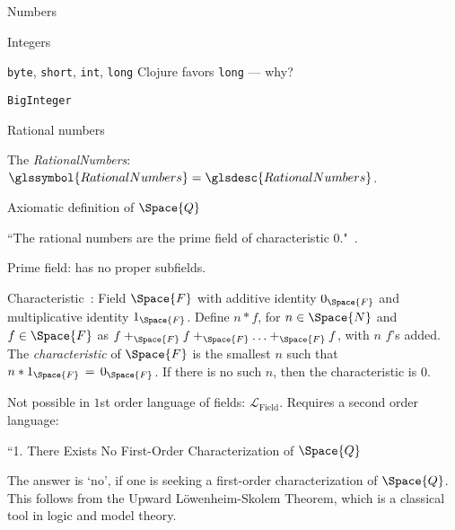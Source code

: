 \begin{plSection}{Numbers}
\begin{plSection}{Integers}
\begin{plSection}{\texttt{byte}, \texttt{short}, \texttt{int},
 \texttt{long}}
Clojure favors \texttt{long} --- why?

\end{plSection}%
\begin{plSection}{\texttt{BigInteger}}
\label{sec:BigInteger}
\end{plSection}%
\end{plSection}%
\begin{plSection}{Rational numbers}
\label{sec:Rational-numbers}

The \textit{\gls{RationalNumbers}}: 
$\glssymbol{RationalNumbers} = \glsdesc{RationalNumbers}$.

\begin{plSection}{Axiomatic definition of \texorpdfstring{$\Space{Q}$}{Q}}
\label{sec:Axiomatic_definition_of_Q}

``The rational numbers are the prime field of characteristic 
0."~\cite{quora:RationalAxioms}.

Prime field: has no proper subfields.

Characteristic~\cite{wiki:FieldMathematics}: 
Field $\Space{F}$ with additive identity $0_{\Space{F}}$
and multiplicative identity $1_{\Space{F}}$.
Define $n \ast f$, for $n \in \Space{N}$ and $f \in \Space{F}$
as $f +_{\Space{F}} f +_{\Space{F}} \ldots +_{\Space{F}} f$, 
with $n$ $f$'s added.
The \textit{characteristic} of $\Space{F}$
is the smallest $n$ such that 
$n \ast 1_{\Space{F}} \,=\, 0_{\Space{F}}$.
If there is no such $n$, then the characteristic is 
$0$.


Not possible in $1$st order language of fields:
$ \mathcal{L}_{\text{Field}} $.
Requires a second order language:


``1. There Exists No First-Order Characterization of $ \Space{Q} $

The answer is ‘no’, if one is seeking a first-order 
characterization of $ \Space{Q} $. 
This follows from the Upward Löwenheim-Skolem Theorem, 
which is a classical tool in logic and model theory.


\end{plSection}
\end{plSection}
\end{plSection}
